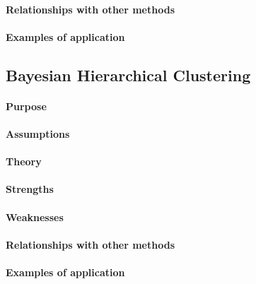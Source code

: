 \paragraph{Relationships with other methods}
\paragraph{Examples of application}

\subsection{Bayesian Hierarchical Clustering}
\paragraph{Purpose}
\paragraph{Assumptions}
\paragraph{Theory}
\paragraph{Strengths}
\paragraph{Weaknesses}
\paragraph{Relationships with other methods}
\paragraph{Examples of application}

